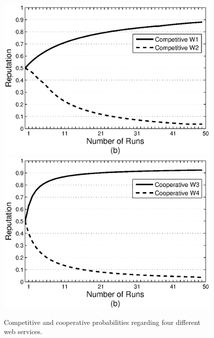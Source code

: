 \documentclass[runningheads,a4paper]{llncs}
\begin{document}
\begin{figure}%
\centering
\includegraphics[scale=0.4]{graphcomp.eps}
\includegraphics[scale=0.4]{graphcoop.eps}
\caption{Competitive and cooperative probabilities regarding four
different web services.} \label{Graph2}
\end{figure}
\end{document}
